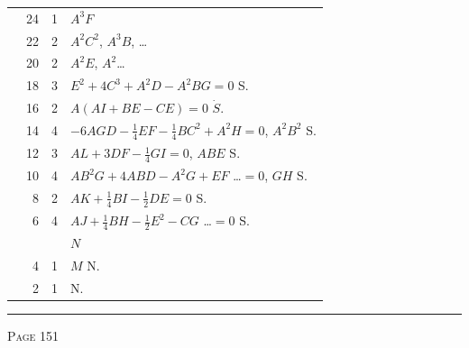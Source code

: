 \documentclass[11pt,a4paper]{article}
\theoremstyle{cayley}
\begin{document}
\begin{center}
\begin{tabular}{rrrl}
  & 24 & 1 & $A^3F$ \\
  & 22 & 2 & $A^2C^2$, $A^3B$, \quad\dots \\
  & 20 & 2 & $A^2E$, $A^2$\dots \\
  & 18 & 3 & $E^2 + 4C^3 + A^2D - A^2BG = 0$ \quad S. \\
  & 16 & 2 & $A(AI + BE - CE) = 0$ \quad $\dot{S}$. \\
  & 14 & 4 & $-6AGD - \frac{1}{4}EF - \frac{1}{4}BC^2 + A^2H = 0$, $A^2B^2$ \quad S. \\
  & 12 & 3 & $AL + 3DF - \frac{1}{4}GI = 0$, $ABE$ \quad S. \\
  & 10 & 4 & $AB^2G + 4ABD - A^2G + EF$ \dots $= 0$, $GH$ \quad S. \\
  &  8 & 2 & $AK + \frac{1}{4}BI - \frac{1}{2}DE = 0$ \quad S. \\
  &  6 & 4 & $AJ + \frac{1}{4}BH - \frac{1}{2}E^2 - CG$ \dots $= 0$ \quad S. \\
  &    & & $N$ \\
  &  4 & 1 & $M$ \quad N. \\
  &  2 & 1 & \quad N. \\
\bottomrule
\end{tabular}
\end{center}

\vspace{1em}
\noindent\rule{\textwidth}{0.4pt}
\begin{center}\textsc{Page 151}\end{center}
\newpage
\end{document}
